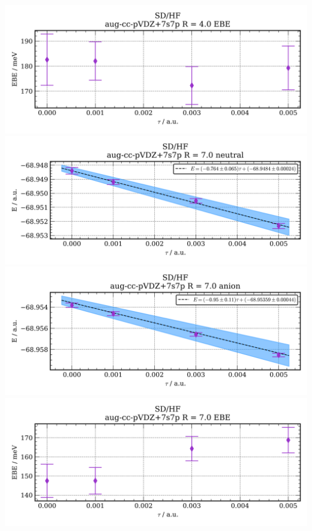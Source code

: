 \includegraphics[width=\textwidth,keepaspectratio]{images/SDshivHF__aug-cc-pvdz+7s7p__4p0_03_ebe.png}
\includegraphics[width=\textwidth,keepaspectratio]{images/SDshivHF__aug-cc-pvdz+7s7p__7p0_01_neutral.png}
\includegraphics[width=\textwidth,keepaspectratio]{images/SDshivHF__aug-cc-pvdz+7s7p__7p0_02_anion.png}
\includegraphics[width=\textwidth,keepaspectratio]{images/SDshivHF__aug-cc-pvdz+7s7p__7p0_03_ebe.png}
